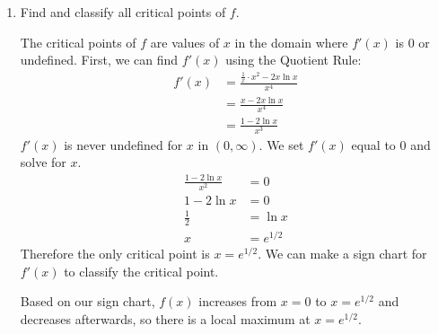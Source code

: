 \documentclass{article}
\begin{document}
\begin{enumerate}[resume]
\begin{enumerate}
    \begin{solution}
      As $x \to 0^+$, the numerator approaches $-\infty$ and
      the denominator approaches $0$.
      \[\lim_{x\to 0^+} \frac{\ln x}{x^2} \genfrac{}{}{0pt}{}{\to -\infty}{\to 0}\]
      This means that the limit overall is approaching either
      $\infty$ or $-\infty$. When $x$ is slightly greater than
      $0$, $x^2$ is a small positive number, therefore
      \[\lim_{x\to 0^+} \frac{\ln x}{x^2}=-\infty\]
    \end{solution}

  \item
    \begin{problem}[\vfill]
      Find and classify all critical points of $f$. 
    \end{problem}

    \begin{solution}
      The critical points of $f$ are values of $x$ in the domain
      where $f'(x)$ is $0$ or undefined. First, we can find $f'(x)$
      using the Quotient Rule:
      \begin{align*}
        f'(x) &= \frac{\frac{1}{x}\cdot x^2 - 2x\ln x}{x^4} \\
        &= \frac{x - 2x\ln x}{x^4} \\
        &= \frac{1-2\ln x}{x^3}
      \end{align*}
      $f'(x)$ is never undefined for $x$ in $(0, \infty)$. We
      set $f'(x)$ equal to $0$ and solve for $x$.
      \begin{align*}
        \frac{1-2\ln x}{x^2} &= 0 \\
        1-2\ln x &= 0 \\
        \tfrac{1}{2} &= \ln x \\
        x &= e^{1/2}
      \end{align*}
      Therefore the only critical point is $x=e^{1/2}$. We can
      make a sign chart for $f'(x)$ to classify the critical point.
      \begin{center}
      \end{center}
      Based on our sign chart, $f(x)$ increases from $x=0$ to $x=e^{1/2}$
      and decreases afterwards, so there is a local maximum at
      $x=e^{1/2}$.


\end{solution}
\end{enumerate}
\end{enumerate}
\end{document}
